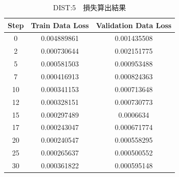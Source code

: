 \documentclass{jreport}		%
\begin{document}
\begin{table}
  \begin{center}
  \caption{DIST:5　損失算出結果}
  \begin{tabular}{c|cc} \hline
Step&Train Data Loss&Validation Data Loss \\ \hline
0&0.004889861&0.001435508 \\
2&0.000730644&0.002151775 \\
5&0.000581503&0.000953488 \\
7&0.000416913&0.000824363 \\
10&0.000341153&0.000713648 \\
12&0.000328151&0.000730773 \\
15&0.000297489&0.0006634 \\
17&0.000243047&0.000671774 \\
20&0.000240547&0.000558295 \\
25&0.000265637&0.000500552 \\
30&0.000361822&0.000595148 \\

\end{tabular}
\end{center}
\end{table}
\end{document}
